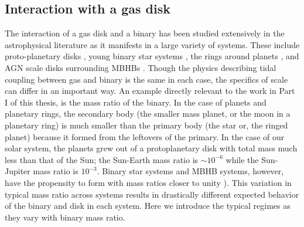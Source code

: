 \subsection{Interaction with a gas disk}

The interaction of a gas disk and a binary has been studied extensively in the
astrophysical literature as it manifests in a large variety of systems. These
include proto-planetary disks \citep[\textit{e.g.}][]{Ward:1997}, young binary
star systems \citep[\textit{e.g.}][]{AL94}, the rings around planets
\citep{GTSaturn78}, and AGN scale disks surrounding MBHBs
\citep[\textit{e.g.}][]{GouldRix:2000}. Though the physics describing tidal
coupling between gas and binary is the same in each case, the specifics of
scale can differ in an important way.  An example directly relevant to the
work in Part I of this thesis, is the mass ratio of the binary. In the case of
planets and planetary rings, the secondary body (the smaller mass planet, or
the moon in a planetary ring) is much smaller than the primary body (the star
or, the ringed planet) because it formed from the leftovers of the primary. In
the case of our solar system, the planets grew out of a protoplanetary disk
with total mass much less than that of the Sun; the Sun-Earth mass
ratio is $\sim10^{-6}$ while the Sun-Jupiter mass ratio is $10^{-3}$. Binary
star systems and MBHB systems, however, have the propensity to form with mass
ratios closer to unity \citep[for MBHBs see previous section, for stars see][]{StellMassRatDist:2015}). This variation in typical mass ratio across
systems results in drastically different expected behavior of the binary and
disk in each system. Here we introduce the typical regimes as they vary with
binary mass ratio.

